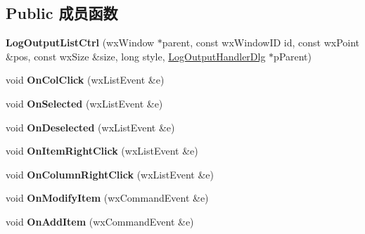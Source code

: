 \subsection*{Public 成员函数}
\begin{DoxyCompactItemize}
\item 
\hypertarget{class_log_output_list_ctrl_a841422d7f9b1c686cf69e34a1317a142}{{\bfseries Log\+Output\+List\+Ctrl} (wx\+Window $\ast$parent, const wx\+Window\+I\+D id, const wx\+Point \&pos, const wx\+Size \&size, long style, \hyperlink{class_log_output_handler_dlg}{Log\+Output\+Handler\+Dlg} $\ast$p\+Parent)}\label{class_log_output_list_ctrl_a841422d7f9b1c686cf69e34a1317a142}

\item 
\hypertarget{class_log_output_list_ctrl_a81aac62fe7ebaf7dacbd95928140fad5}{void {\bfseries On\+Col\+Click} (wx\+List\+Event \&e)}\label{class_log_output_list_ctrl_a81aac62fe7ebaf7dacbd95928140fad5}

\item 
\hypertarget{class_log_output_list_ctrl_a82a99fe1afd1173691c3021cb52758e1}{void {\bfseries On\+Selected} (wx\+List\+Event \&e)}\label{class_log_output_list_ctrl_a82a99fe1afd1173691c3021cb52758e1}

\item 
\hypertarget{class_log_output_list_ctrl_a35e8c492f5cf94a80606e8ad5a7e437f}{void {\bfseries On\+Deselected} (wx\+List\+Event \&e)}\label{class_log_output_list_ctrl_a35e8c492f5cf94a80606e8ad5a7e437f}

\item 
\hypertarget{class_log_output_list_ctrl_ae0955ebb75abb063d8573fb3fc4e1264}{void {\bfseries On\+Item\+Right\+Click} (wx\+List\+Event \&e)}\label{class_log_output_list_ctrl_ae0955ebb75abb063d8573fb3fc4e1264}

\item 
\hypertarget{class_log_output_list_ctrl_a56dbb0edd2cec71d99dab042d2741b8b}{void {\bfseries On\+Column\+Right\+Click} (wx\+List\+Event \&e)}\label{class_log_output_list_ctrl_a56dbb0edd2cec71d99dab042d2741b8b}

\item 
\hypertarget{class_log_output_list_ctrl_aedef8c5a543eb62c433fa5f65e80644d}{void {\bfseries On\+Modify\+Item} (wx\+Command\+Event \&e)}\label{class_log_output_list_ctrl_aedef8c5a543eb62c433fa5f65e80644d}

\item 
\hypertarget{class_log_output_list_ctrl_a4ffe9c2534f76851665d877331d22c87}{void {\bfseries On\+Add\+Item} (wx\+Command\+Event \&e)}\label{class_log_output_list_ctrl_a4ffe9c2534f76851665d877331d22c87}


\end{DoxyCompactItemize}
